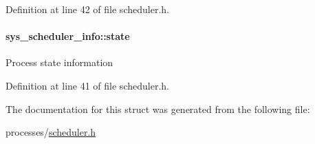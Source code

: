 Definition at line 42 of file scheduler.\+h.

\hypertarget{structsys__scheduler__info_ac43d2cf748d5c052df80179e72c1d355}{}
\paragraph[{state}]{ sys\+\_\+scheduler\+\_\+info\+::state}\label{structsys__scheduler__info_ac43d2cf748d5c052df80179e72c1d355}
Process state information 

Definition at line 41 of file scheduler.\+h.



The documentation for this struct was generated from the following file\+:\begin{DoxyCompactItemize}
\item 
processes/\hyperlink{scheduler_8h}{scheduler.\+h}\end{DoxyCompactItemize}

